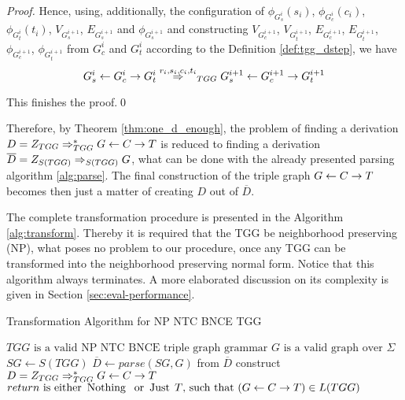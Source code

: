 \begin{proof}
	Hence, using, additionally, the configuration of $\phi_{G^i_s}(s_i)$, $\phi_{G^i_c}(c_i)$, $\phi_{G^i_t}(t_i)$, $V_{G^{i+1}_s}$, $E_{G^{i+1}_s}$ and $\phi_{G^{i+1}_s}$ and constructing $V_{G^{i+1}_c}$, $V_{G^{i+1}_t}$, $E_{G^{i+1}_c}$, $E_{G^{i+1}_t}$, $\phi_{G^{i+1}_c}$, $\phi_{G^{i+1}_t}$ from $G^i_c$ and $G^i_t$ according to the Definition \ref{def:tgg_dstep}, we have 
	\begin{equation*}
		G^i_s \ms{} G^i_c \mt{} G^i_t \tderiv{r_i}{s_i,c_i,t_i}{TGG} G^{i+1}_s \ms{} G^{i+1}_c \mt{} G^{i+1}_t
	\end{equation*}
	
	This finishes the proof.\qed
\end{proof}

Therefore, by Theorem \ref{thm:one_d_enough}, the problem of finding a derivation $D = Z_{TGG} \Rightarrow^*_{TGG} G \overset{}{\leftarrow} C \overset{}{\rightarrow} T$ is reduced to finding a derivation $\overline{D} = \startG{S(TGG)} \deriv{}{}{S(TGG)} G$, what can be done with the already presented parsing algorithm \ref{alg:parse}. The final construction of the triple graph $G \overset{}{\leftarrow} C \overset{}{\rightarrow} T$ becomes then just a matter of creating $D$ out of $\overline{D}$.

The complete transformation procedure is presented in the Algorithm \ref{alg:transform}. Thereby it is required that the TGG be neighborhood preserving (NP), what poses no problem to our procedure, once any TGG can be transformed into the neighborhood preserving normal form.  Notice that this algorithm always terminates. A more elaborated discussion on its complexity is given in Section \ref{sec:eval-performance}.


\begin{algorithm}[!h]
	\caption{Transformation Algorithm for NP NTC BNCE TGG}
	\begin{algorithmic}[!ht]
		\Require $TGG \text{ is a valid NP NTC BNCE triple graph grammar}$
		\Require $G \text{ is a valid graph over } \Sigma$
		\State $SG \gets S(TGG)$ 
		\State $\overline{D} \gets parse(SG,G)$ 
		 
		\State from $\overline{D}$ construct $D = Z_{TGG} \Rightarrow^*_{TGG} G \overset{}{\leftarrow} C \overset{}{\rightarrow} T$
		\State {}
		\Else
		\State \Return {$\Nothing$} 
		\EndIf
		\EndFunction 
		\Ensure $return \text{ is either } \operatorname{\text{Nothing}}\; \text{ or } \operatorname{\text{Just}}\; T \text{, such that } (G \overset{}{\leftarrow} C \overset{}{\rightarrow} T) \in L(TGG)$
	\end{algorithmic}
	\label{alg:transform}
\end{algorithm}

